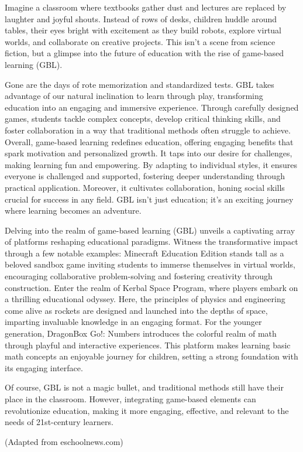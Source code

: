 \documentclass[12pt,a4paper,twoside]{article}
\newenvironment{readingpassage}[1][]{%
    \begin{tcolorbox}[enhanced, colback=grayLight, colframe=secondaryBlue,
        coltitle=textDark, fonttitle=\bfseries, title={#1},
        rounded corners, arc=3mm, boxrule=1pt,
        left=15pt, right=15pt, top=10pt, bottom=10pt,
        breakable, before skip=10pt, after skip=10pt, drop fuzzy shadow]
    \setstretch{1.3}
}{\end{tcolorbox}}
\begin{document}
\begin{readingpassage}[]
Imagine a classroom where textbooks gather dust and lectures are replaced by laughter and joyful shouts. Instead of rows of desks, children huddle around tables, their eyes bright with excitement as they build robots, explore virtual worlds, and collaborate on creative projects. This isn’t a scene from science fiction, but a glimpse into the future of education with the rise of game-based learning (GBL).

Gone are the days of rote memorization and standardized tests. GBL takes advantage of our natural inclination to learn through play, transforming education into an engaging and immersive experience. Through carefully designed games, students tackle complex concepts, develop critical thinking skills, and foster collaboration in a way that traditional methods often struggle to achieve. Overall, game-based learning redefines education, offering engaging benefits that spark motivation and personalized growth. It taps into our desire for challenges, making learning fun and empowering. By adapting to individual styles, it ensures everyone is challenged and supported, fostering deeper understanding through practical application. Moreover, it cultivates collaboration, honing social skills crucial for success in any field. GBL isn't just education; it's an exciting journey where learning becomes an adventure.

Delving into the realm of game-based learning (GBL) unveils a captivating array of platforms reshaping educational paradigms. Witness the transformative impact through a few notable examples: Minecraft Education Edition stands tall as a beloved sandbox game inviting students to immerse themselves in virtual worlds, encouraging collaborative problem-solving and fostering creativity through construction. Enter the realm of Kerbal Space Program, where players embark on a thrilling educational odyssey. Here, the principles of physics and engineering come alive as rockets are designed and launched into the depths of space, imparting invaluable knowledge in an engaging format. For the younger generation, DragonBox Go!: Numbers introduces the colorful realm of math through playful and interactive experiences. This platform makes learning basic math concepts an enjoyable journey for children, setting a strong foundation with its engaging interface.

Of course, GBL is not a magic bullet, and traditional methods still have their place in the classroom. However, integrating game-based elements can revolutionize education, making it more engaging, effective, and relevant to the needs of 21st-century learners.

(Adapted from eschoolnews.com)
\end{readingpassage}
\end{document}
